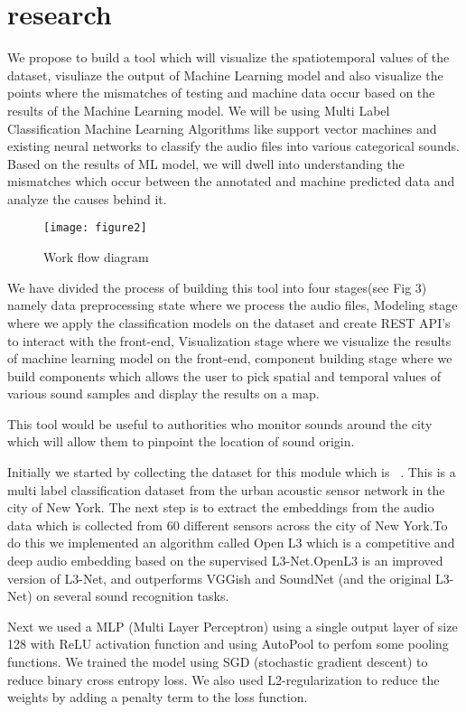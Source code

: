 	\section{research}
    We propose to build a tool which will visualize the spatiotemporal values of the dataset, visuliaze the output of Machine Learning model and also visualize the points where the mismatches of testing and machine data occur based on the results of the Machine Learning model. We will be using Multi Label Classification Machine Learning Algorithms like support vector machines and existing neural networks to classify the audio files into various categorical sounds. Based on the results of ML model, we will dwell into understanding the mismatches which occur between the annotated and machine predicted data and analyze the causes behind it. 
    
    	\begin{figure}[h!]
    	\texttt{[image: figure2]}
    	\caption{ Work flow diagram}
    \end{figure}
    
   
   	We have divided the process of building this tool into four stages(see Fig 3) namely data preprocessing state where we process the audio files, Modeling stage where we apply the classification models on the dataset and create REST API's to interact with the front-end, Visualization stage where we visualize the results of machine learning model on the front-end, component building stage where we build components which allows the user to pick spatial and temporal values of various sound samples and display the results on a map.
   	
    This tool would be useful to authorities who monitor sounds around the city which will allow them to pinpoint the location of sound origin.
    
    Initially we started by collecting the dataset for this module which is ~\cite{7}. This is a multi label classification dataset from the urban acoustic sensor network in the city of New York. The next step is to extract the embeddings from the audio data which is collected from 60 different sensors across the city of New York.To do this we implemented an algorithm called Open L3 which is a competitive and deep audio embedding based on the supervised L3-Net.OpenL3 is an improved version of L3-Net, and outperforms VGGish and SoundNet (and the original L3-Net) on several sound recognition tasks.
    
    Next we used a MLP (Multi Layer Perceptron) using a single output layer of size 128 with ReLU activation function and using AutoPool to perfom some pooling functions. We trained the model using SGD (stochastic gradient descent) to reduce binary cross entropy loss. We also used L2-regularization to reduce the weights by adding a penalty term to the loss function.
    
